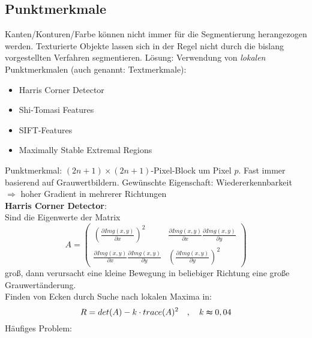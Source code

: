 \subsection{Punktmerkmale}

Kanten/Konturen/Farbe können nicht immer für die Segmentierung herangezogen werden. Texturierte Objekte lassen sich in der Regel nicht durch die bislang vorgestellten Verfahren segmentieren. Lösung: Verwendung von \textsl{lokalen} Punktmerkmalen (auch genannt: Textmerkmale):
\begin{itemize}
\item Harris Corner Detector
\item Shi-Tomasi Features
\item SIFT-Features
\item Maximally Stable Extremal Regions
\end{itemize}
Punktmerkmal: $(2n+1) \times (2n+1)$-Pixel-Block um Pixel $p$. Fast immer basierend auf Grauwertbildern. Gewünschte Eigenschaft: Wiedererkennbarkeit \\ $\Rightarrow$ hoher Gradient in mehrerer Richtungen \\[0,1cm]
\textbf{Harris Corner Detector}: \\
Sind die Eigenwerte der Matrix $$A = \left( \begin{array}{cc} \left( \frac{\partial Img(x,y)}{\partial x} \right)^2 & \frac{\partial Img(x,y)}{\partial x} \frac{\partial Img(x,y)}{\partial y} \\ \frac{\partial Img(x,y)}{\partial x} \frac{\partial Img(x,y)}{\partial y} & \left( \frac{\partial Img(x,y)}{\partial y} \right)^2 \end{array} \right)$$ groß, dann verursacht eine kleine Bewegung in beliebiger Richtung eine große Grauwertänderung. \\ Finden von Ecken durch Suche nach lokalen Maxima in: $$R = det(A) - k \cdot trace(A)^2 \quad , \quad k \thickapprox 0,04$$
Häufiges Problem:
